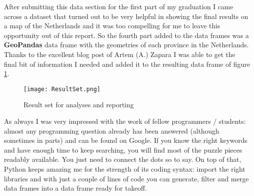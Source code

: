 \medskip
After submitting this data section for the first part of my graduation I came across a dataset that turned out to be very helpful in showing the final results on a map of the Netherlands and it was too compelling for me to leave this opportunity out of this report. So the fourth part added to the data frames was a \textbf{GeoPandas} data frame with the geometries of each province in the Netherlands. Thanks to the excellent blog post of Artem (A.) Zapara \cite{STUDENT2} I was able to get the final bit of information I needed and added it to the resulting data frame of figure \ref{resultset}.
\medskip
\begin{figure}[H]
	\center
	\texttt{[image: ResultSet.png]}	
	\caption{Result set for analyses and reporting}
	\label{resultset}
\end{figure}
\medskip
As always I was very impressed with the work of fellow programmers / students: almost any programming question already has been answered (although sometimes in parts) and can be found on Google. If you know the right keywords and have enough time to keep searching, you will find most of the puzzle pieces readably available. You just need to connect the dots so to say. On top of that, Python keeps amazing me for the strength of its coding syntax: import the right libraries and with just a couple of lines of code you can generate, filter and merge data frames into a data frame ready for takeoff.


